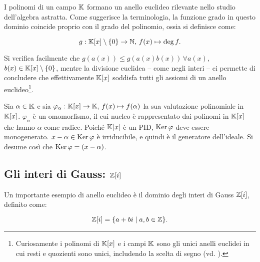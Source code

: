 I polinomi di un campo $\mathbb{K}$ formano un anello euclideo rilevante
nello studio dell'algebra astratta. Come suggerisce la
terminologia, la funzione grado in questo dominio coincide
proprio con il grado del polinomio, ossia si definisce come:

\[g : \mathbb{K}[x] \setminus \{0\} \to \mathbb N, \, f(x) \mapsto \deg f.\]

\vskip 0.1in

Si verifica facilmente che $g(a(x)) \leq g(a(x)b(x)) \, \forall a(x)$, $b(x) \in \mathbb{K}[x] \setminus \{0\}$, mentre la divisione euclidea -- come negli interi -- ci permette
di concludere che effettivamente $\mathbb{K}[x]$ soddisfa tutti gli assiomi di un anello
euclideo\footnote{Curiosamente i polinomi di $\mathbb{K}[x]$ e i campi $\mathbb{K}$ sono gli unici anelli euclidei in cui resti
    e quozienti sono unici, includendo la scelta di segno (vd.
    \cite{10.2307/2315810}).}.

\begin{example}
    Sia $\alpha \in \mathbb{K}$ e sia $\varphi_\alpha : \mathbb{K}[x] \to \mathbb{K}, \, f(x) \mapsto f(\alpha)$
    la sua valutazione polinomiale in $\mathbb{K}[x]$. $\varphi_\alpha$ è un omomorfismo, il cui
    nucleo è rappresentato dai polinomi in $\mathbb{K}[x]$ che hanno $\alpha$ come radice. Poiché
    $\mathbb{K}[x]$ è un PID, $\operatorname{Ker} \varphi$ deve essere monogenerato. $x-\alpha \in \operatorname{Ker} \varphi$
    è irriducibile, e quindi è il generatore dell'ideale. Si desume così che
    $\operatorname{Ker} \varphi = (x-\alpha)$.
\end{example}

\subsection{Gli interi di Gauss: \texorpdfstring{$\mathbb Z[i]$}{Z[i]}}

Un importante esempio di anello euclideo è il dominio degli interi di Gauss $\mathbb Z[i]$, definito come:

\[\mathbb Z[i] = \{a+bi \mid a, b \in \mathbb Z\}.\]

\vskip 0.1in

